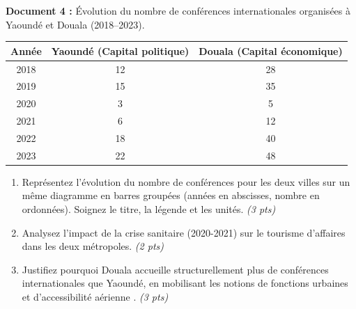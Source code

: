 \documentclass[11pt]{article}
\begin{document}
\begin{exercice}
\textbf{Document 4 :} Évolution du nombre de conférences internationales organisées à Yaoundé et Douala (2018--2023).
\begin{center}
\begin{tabular}{|c|c|c|}
\hline
\textbf{Année} & \textbf{Yaoundé (Capital politique)} & \textbf{Douala (Capital économique)} \\ \hline
2018 & 12 & 28 \\ \hline
2019 & 15 & 35 \\ \hline
2020 & 3 & 5 \\ \hline
2021 & 6 & 12 \\ \hline
2022 & 18 & 40 \\ \hline
2023 & 22 & 48 \\ \hline
\end{tabular}
\end{center}

\begin{enumerate}
    \item Représentez l'évolution du nombre de conférences pour les deux villes sur un même diagramme en barres groupées (années en abscisses, nombre en ordonnées). Soignez le titre, la légende et les unités. \textit{(3 pts)}
    \item Analysez l'impact de la crise sanitaire (2020-2021) sur le tourisme d'affaires dans les deux métropoles. \textit{(2 pts)}
    \item Justifiez pourquoi Douala accueille structurellement plus de conférences internationales que Yaoundé, en mobilisant les notions de \og fonctions urbaines \fg{} et d'\og accessibilité aérienne \fg{}. \textit{(3 pts)}
\end{enumerate}
\end{exercice}
\end{document}
